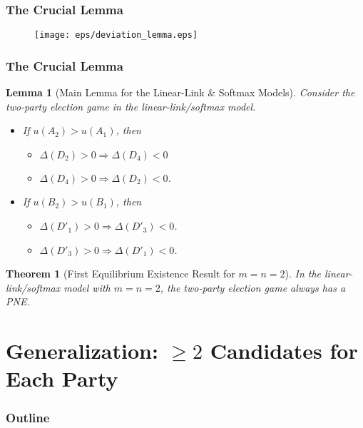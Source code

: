 \documentclass[xcolor=dvipsnames,envcountsect]{beamer}
\newtheorem*{theory}{Theorem}
\newtheorem*{lemm}{Lemma}
\begin{document}
\begin{frame}
	\frametitle{The Crucial Lemma}
	\vspace{-7pt}
	\begin{figure}
		\begin{center}
			\texttt{[image: eps/deviation\_lemma.eps]}
		\end{center}
	\end{figure}
\end{frame}


\begin{frame}
	\frametitle{The Crucial Lemma}
	\vspace{-5pt}
	\begin{lemm}[Main Lemma for the Linear-Link \& Softmax Models]
	\label{lem:devConf_LL}
	Consider the two-party election game in the linear-link/softmax model. 
	\begin{itemize}
	 \item If $u(A_2) > u(A_1)$, then 
	 	\begin{itemize}
	 		\item $\Delta(D_2) > 0\Rightarrow \Delta(D_4) < 0$ 
	 		\item $\Delta(D_4) > 0\Rightarrow \Delta(D_2) < 0$. 
	 	\end{itemize}
 	\item If $u(B_2) > u(B_1)$, then 
 		\begin{itemize}
 			\item $\Delta(D'_1) > 0 \Rightarrow \Delta(D'_3) < 0$.
 			\item $\Delta(D'_3) > 0 \Rightarrow \Delta(D'_1) < 0$.
 		\end{itemize}
 	\end{itemize}
	\end{lemm}
\pause
\begin{theory}[First Equilibrium Existence Result for $m=n=2$]
	In the linear-link/softmax model with $m = n = 2$, the two-party election game always has a PNE.  \Smiley
\end{theory}
\end{frame}


\section{Generalization: $\geq 2$ Candidates for Each Party}


\begin{frame}
\frametitle{Outline}
\end{frame}
\end{document}
